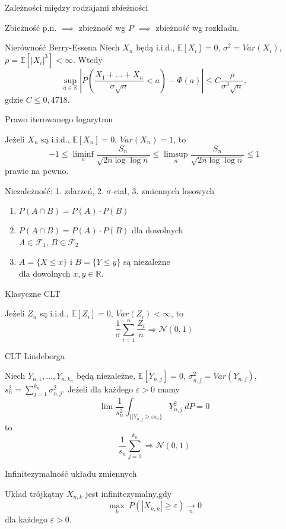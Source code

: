 \documentclass[avery5371,grid,frame]{flashcards}
\begin{document}
\begin{flashcard}[Twierdzenie]{Zależności między rodzajami zbieżności}

\smallskip
Zbieżność p.n. $\implies$ zbieżność wg $P$ $\implies$ zbieżność wg rozkładu.
\end{flashcard}

\begin{flashcard}[Twierdzenie]{Nierówność Berry-Essena}
	\smallskip
	Niech $X_n$ będą i.i.d., $\mathbb{E}[X_i] = 0$, $\sigma^2 = Var(X_i)$, $\rho = \mathbb{E}[|X_i|^3] < \infty$. Wtedy
	$$ \sup_{a \in \mathbb{R}} \left | P\left(\frac{X_1 + \dots + X_n}{\sigma \sqrt{n}} < a \right ) - \Phi(a) \right | \leq C \frac{\rho}{\sigma^3 \sqrt{n}},$$ gdzie $C \leq 0,4718$.
\end{flashcard}

\begin{flashcard}[Twierdzenie]{Prawo iterowanego logarytmu}

\smallskip
Jeżeli $X_n$ są i.i.d., $\mathbb{E}[X_n] = 0$, $Var(X_n) = 1$, to
$$ -1 \leq \liminf_n \frac{S_n}{\sqrt{2n \log \log n}} \leq  \limsup_n \frac{S_n}{\sqrt{2n \log \log n}} \leq 1$$ prawie na pewno.
\end{flashcard}

\begin{flashcard}[Definicja]{Niezależność: 1. zdarzeń, 2. $\sigma$-ciał, 3. zmiennych losowych}

\smallskip
\begin{enumerate}
	\item $P(A \cap B) = P(A) \cdot P(B)$
	\item $P(A \cap B) = P(A) \cdot P(B)$ dla dowolnych \\
	$A \in \mathcal{F}_1$, $B \in \mathcal{F}_2$
	\item $A = \{X \leq x\}$ i $B = \{Y \leq y\}$ są niezależne \\ 
	dla dowolnych $x, y \in \mathbb{R}$.
\end{enumerate}
\end{flashcard}

\begin{flashcard}[Twierdzenie]{Klasyczne CLT}

\smallskip
Jeżeli $Z_n$ są i.i.d., $\mathbb{E}[Z_i] = 0$, $Var(Z_i) < \infty$, to $$\frac{1}{\sigma} \sum_{i=1}^n \frac{Z_i}{n} \Rightarrow \mathcal{N}(0, 1)$$
\end{flashcard}

\begin{flashcard}[Twierdzenie]{CLT Lindeberga}

\smallskip
Niech $Y_{n, 1}, \dots, Y_{n, k_n}$ będą niezależne, $\mathbb{E}[Y_{n, j}] = 0$, $\sigma_{n, j}^2 = Var(Y_{n, j})$, $s_n^2 = \sum_{j = 1}^{k_n} \sigma_{n, j}^2$. Jeżeli dla każdego $\varepsilon > 0$ mamy
$$\lim \frac{1}{s_n^2} \int_{\{|Y_{n, j} \geq \varepsilon s_n\}} Y_{n, j}^2 \ dP = 0$$
to
$$ \frac{1}{s_n} \sum_{j = 1}^{k_n} \Rightarrow \mathcal{N}(0, 1)$$
\end{flashcard}

\begin{flashcard}[Definicja]{Infinitezymalność układu zmiennych}

\smallskip
Układ trójkątny $X_{n, k}$ jest infinitezymalny,gdy
$$\max_k \ P(|X_{n, k}| \geq \varepsilon) \xrightarrow[n]{} 0$$ dla każdego $\varepsilon > 0$.
\end{flashcard}
\end{document}
